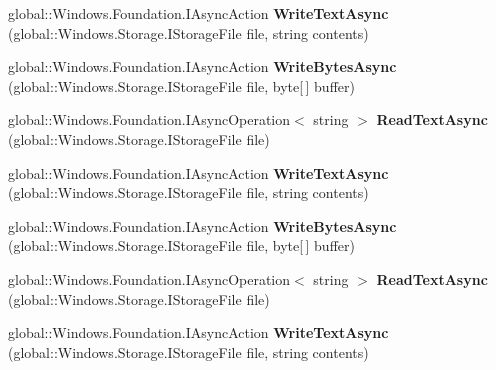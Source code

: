 \begin{DoxyCompactItemize}
global\+::\+Windows.\+Foundation.\+I\+Async\+Action {\bfseries Write\+Text\+Async} (global\+::\+Windows.\+Storage.\+I\+Storage\+File file, string contents)
\item 
\mbox{\label{interface_windows_1_1_storage_1_1_i_file_i_o_statics_a280b21167530e3370e010a055af41c65}} 
global\+::\+Windows.\+Foundation.\+I\+Async\+Action {\bfseries Write\+Bytes\+Async} (global\+::\+Windows.\+Storage.\+I\+Storage\+File file, byte\mbox{[}$\,$\mbox{]} buffer)
\item 
\mbox{\label{interface_windows_1_1_storage_1_1_i_file_i_o_statics_a8b4c0f9fe8b0238779101b3f516c0f69}} 
global\+::\+Windows.\+Foundation.\+I\+Async\+Operation$<$ string $>$ {\bfseries Read\+Text\+Async} (global\+::\+Windows.\+Storage.\+I\+Storage\+File file)
\item 
\mbox{\label{interface_windows_1_1_storage_1_1_i_file_i_o_statics_ac3b1c12a4964c9e4aac34a8555d76db6}} 
global\+::\+Windows.\+Foundation.\+I\+Async\+Action {\bfseries Write\+Text\+Async} (global\+::\+Windows.\+Storage.\+I\+Storage\+File file, string contents)
\item 
\mbox{\label{interface_windows_1_1_storage_1_1_i_file_i_o_statics_a280b21167530e3370e010a055af41c65}} 
global\+::\+Windows.\+Foundation.\+I\+Async\+Action {\bfseries Write\+Bytes\+Async} (global\+::\+Windows.\+Storage.\+I\+Storage\+File file, byte\mbox{[}$\,$\mbox{]} buffer)
\item 
\mbox{\label{interface_windows_1_1_storage_1_1_i_file_i_o_statics_a8b4c0f9fe8b0238779101b3f516c0f69}} 
global\+::\+Windows.\+Foundation.\+I\+Async\+Operation$<$ string $>$ {\bfseries Read\+Text\+Async} (global\+::\+Windows.\+Storage.\+I\+Storage\+File file)
\item 
\mbox{\label{interface_windows_1_1_storage_1_1_i_file_i_o_statics_ac3b1c12a4964c9e4aac34a8555d76db6}} 
global\+::\+Windows.\+Foundation.\+I\+Async\+Action {\bfseries Write\+Text\+Async} (global\+::\+Windows.\+Storage.\+I\+Storage\+File file, string contents)

\end{DoxyCompactItemize}
